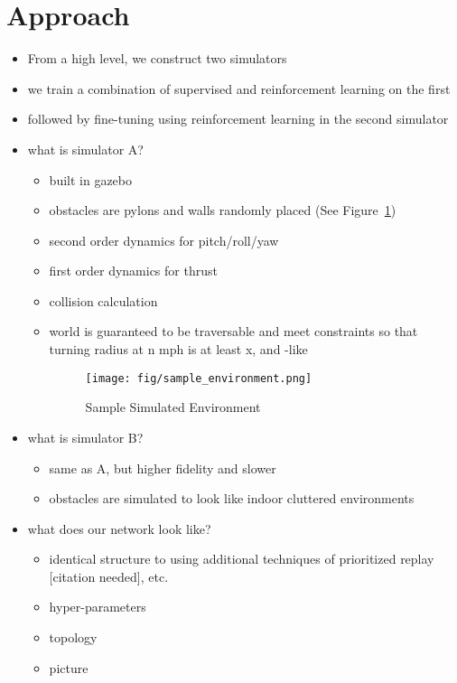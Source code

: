 \documentclass[paper=a4, fontsize=11pt]{scrartcl} %
\begin{document}
\section{Approach} 
\begin{itemize}
	\item From a high level, we construct two simulators
	\item we train a combination of supervised and reinforcement learning on the first
	\item followed by fine-tuning using reinforcement learning in the second simulator
\end{itemize}

\begin{itemize}
	\item what is simulator A?
	\begin{itemize}
		\item built in gazebo
		\item obstacles are pylons and walls randomly placed (See Figure~\ref{fig:sample_environment})
		\item second order dynamics for pitch/roll/yaw
		\item first order dynamics for thrust
		\item collision calculation
		\item world is guaranteed to be traversable and meet constraints so that turning radius at n mph is at least x, and \cite{Richter2014}-like 
		\begin{figure}
		  \centering
		  \texttt{[image: fig/sample\_environment.png]}
		  \caption{Sample Simulated Environment}
		  \label{fig:sample_environment}
		\end{figure}
	\end{itemize}

	\item what is simulator B?
	\begin{itemize}
		\item same as A, but higher fidelity and slower
		\item obstacles are simulated to look like indoor cluttered environments
	\end{itemize}

	\item what does our network look like?
	\begin{itemize}
		\item identical structure to \cite{Lillicrap2015} using additional techniques of prioritized replay [citation needed], etc.
		\item hyper-parameters
		\item topology
		\item picture
	\end{itemize}


\end{itemize}
\end{document}
